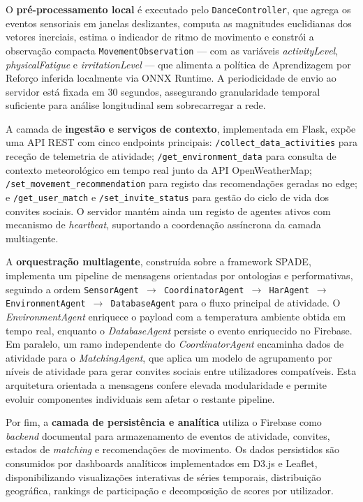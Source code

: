 \documentclass[runningheads]{llncs}
\begin{document}
O \textbf{pré-processamento local} é executado pelo \texttt{DanceController}, que agrega os eventos sensoriais em janelas deslizantes, computa as magnitudes euclidianas dos vetores inerciais, estima o indicador de ritmo de movimento e constrói a observação compacta \texttt{MovementObservation} --- com as variáveis \emph{activityLevel}, \emph{physicalFatigue} e \emph{irritationLevel} --- que alimenta a política de Aprendizagem por Reforço inferida localmente via ONNX Runtime. A periodicidade de envio ao servidor está fixada em 30 segundos, assegurando granularidade temporal suficiente para análise longitudinal sem sobrecarregar a rede.

A camada de \textbf{ingestão e serviços de contexto}, implementada em Flask, expõe uma API REST com cinco endpoints principais: \texttt{/collect\_data\_activities} para receção de telemetria de atividade; \texttt{/get\_environment\_data} para consulta de contexto meteorológico em tempo real junto da API OpenWeatherMap; \texttt{/set\_movement\_recommendation} para registo das recomendações geradas no edge; e \texttt{/get\_user\_match} e \texttt{/set\_invite\_status} para gestão do ciclo de vida dos convites sociais. O servidor mantém ainda um registo de agentes ativos com mecanismo de \emph{heartbeat}, suportando a coordenação assíncrona da camada multiagente.

A \textbf{orquestração multiagente}, construída sobre a framework SPADE, implementa um pipeline de mensagens orientadas por ontologias e performativas, seguindo a ordem \texttt{SensorAgent $\rightarrow$ CoordinatorAgent $\rightarrow$ HarAgent $\rightarrow$ EnvironmentAgent $\rightarrow$ DatabaseAgent} para o fluxo principal de atividade. O \textit{EnvironmentAgent} enriquece o payload com a temperatura ambiente obtida em tempo real, enquanto o \textit{DatabaseAgent} persiste o evento enriquecido no Firebase. Em paralelo, um ramo independente do \textit{CoordinatorAgent} encaminha dados de atividade para o \textit{MatchingAgent}, que aplica um modelo de agrupamento por níveis de atividade para gerar convites sociais entre utilizadores compatíveis. Esta arquitetura orientada a mensagens confere elevada modularidade e permite evoluir componentes individuais sem afetar o restante pipeline.

Por fim, a \textbf{camada de persistência e analítica} utiliza o Firebase como \emph{backend} documental para armazenamento de eventos de atividade, convites, estados de \emph{matching} e recomendações de movimento. Os dados persistidos são consumidos por dashboards analíticos implementados em D3.js e Leaflet, disponibilizando visualizações interativas de séries temporais, distribuição geográfica, rankings de participação e decomposição de scores por utilizador.
\end{document}
